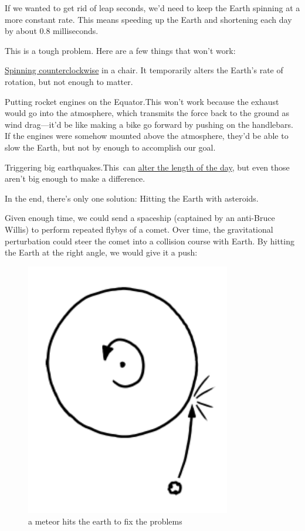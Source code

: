 {If we wanted to get rid of leap seconds, we’d need to keep the Earth spinning at a more constant rate. This means speeding up the Earth and shortening each day by about 0.8 milliseconds.}

{This is a tough problem. Here are a few things that won’t work:}

{ \href{http://xkcd.com/162/}{Spinning counterclockwise} in a chair. It temporarily alters the Earth’s rate of rotation, but not enough to matter.}

{Putting rocket engines on the Equator.This won’t work because the exhaust would go into the atmosphere, which transmits the force back to the ground as wind drag—it’d be like making a bike go forward by pushing on the handlebars. If the engines were somehow mounted above the atmosphere, they’d be able to slow the Earth, but not by enough to accomplish our goal.}

{Triggering big earthquakes.This can \href{http://www.nasa.gov/topics/earth/features/japanquake/earth20110314.html}{alter the length of the day}, but even those aren’t big enough to make a difference.}

{In the end, there’s only one solution: Hitting the Earth with asteroids.}

{Given enough time, we could send a spaceship (captained by an anti-Bruce Willis) to perform repeated flybys of a comet. Over time, the gravitational perturbation could steer the comet into a collision course with Earth. By hitting the Earth at the right angle, we would give it a push:}

\begin{figure}[!htbp]
\centering
\includegraphics[scale=0.5, max width=0.8\textwidth]{imgs/a/26/leap_strike.png}
\caption{a meteor hits the earth to fix the problems}
\end{figure}

